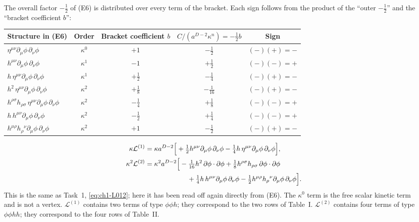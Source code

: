 The overall factor $-\tfrac12$ of (E6) is distributed over every term of the
bracket. Each sign follows from the product of the ``outer $-\tfrac12$'' and the
``bracket coefficient $b$'':
\begin{center}
\small
\begin{tabular}{lcccc}
\toprule
Structure in (E6) & Order & Bracket coefficient $b$ & $C/(a^{D-2}\kappa^n)=-\tfrac12b$ & Sign\\
\midrule
$\eta^{\mu\nu}\partial_\mu\phi\,\partial_\nu\phi$ & $\kappa^0$ & $+1$ & $-\tfrac12$ & $(-)(+)=-$\\
$h^{\mu\nu}\partial_\mu\phi\,\partial_\nu\phi$ & $\kappa^1$ & $-1$ & $+\tfrac12$ & $(-)(-)=+$\\
$h\,\eta^{\mu\nu}\partial_\mu\phi\,\partial_\nu\phi$ & $\kappa^1$ & $+\tfrac12$ & $-\tfrac14$ & $(-)(+)=-$\\
$h^2\,\eta^{\mu\nu}\partial_\mu\phi\,\partial_\nu\phi$ & $\kappa^2$ & $+\tfrac18$ & $-\tfrac1{16}$ & $(-)(+)=-$\\
$h^{\rho\sigma}h_{\rho\sigma}\,\eta^{\mu\nu}\partial_\mu\phi\,\partial_\nu\phi$ & $\kappa^2$ & $-\tfrac14$ & $+\tfrac18$ & $(-)(-)=+$\\
$h\,h^{\mu\nu}\partial_\mu\phi\,\partial_\nu\phi$ & $\kappa^2$ & $-\tfrac12$ & $+\tfrac14$ & $(-)(-)=+$\\
$h^{\mu\rho}h_\rho{}^\nu\partial_\mu\phi\,\partial_\nu\phi$ & $\kappa^2$ & $+1$ & $-\tfrac12$ & $(-)(+)=-$\\
\bottomrule
\end{tabular}
\end{center}
\begin{equation}
\begin{aligned}
\kappa\mathcal L^{(1)}&=\kappa a^{D-2}\Big[+\tfrac12h^{\mu\nu}\partial_\mu\phi\,\partial_\nu\phi-\tfrac14h\,\eta^{\mu\nu}\partial_\mu\phi\,\partial_\nu\phi\Big],\\
\kappa^2\mathcal L^{(2)}&=\kappa^2a^{D-2}\Big[-\tfrac1{16}h^2\,\partial\phi\cdot\partial\phi+\tfrac18h^{\rho\sigma}h_{\rho\sigma}\,\partial\phi\cdot\partial\phi\\
&\hspace{6.2em}+\tfrac14h\,h^{\mu\nu}\partial_\mu\phi\,\partial_\nu\phi-\tfrac12h^{\mu\rho}h_\rho{}^\nu\partial_\mu\phi\,\partial_\nu\phi\Big].
\end{aligned}
\label{eq:ch1-L12}
\end{equation}
This is the same as Task~1, \eqref{eq:ch1-L012}; here it has been read off again
directly from (E6). The $\kappa^0$ term is the free scalar kinetic term and is
not a vertex. $\mathcal L^{(1)}$ contains two terms of type $\phi\phi h$; they
correspond to the two rows of Table~I. $\mathcal L^{(2)}$ contains four terms of
type $\phi\phi hh$; they correspond to the four rows of Table~II.

